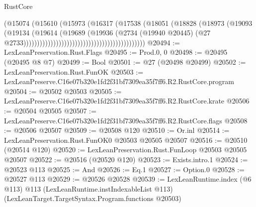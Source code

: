 \begin{lexlean}{RustCore}
\begin{coremodule}
                                                                (@15074
                                                                  (@15610
                                                                    (@15973
                                                                      (@16317
                                                                        (@17538
                                                                          (@18051
                                                                            (@18828
                                                                              (@18973
                                                                                (@19093
                                                                                  (@19134
                                                                                    (@19614
                                                                                      (@19689
                                                                                        (@19936
                                                                                          (@2734
                                                                                            (@19940
                                                                                              @20445)
                                                                                            (@27
                                                                                              @2733)))))))))))))))))))))))))))))))))))))))))))))
@20494 := LexLeanPreservation.Rust.Flags
@20495 := Prod.{0, 0}
@20498 := @20495 (@20495 @8 @7)
@20499 := Bool
@20501 := @27 (@20498 @20499)
@20502 := LexLeanPreservation.Rust.FunOK
@20503 := LexLeanPreserve.C16e07b320e1fd2f31bf7309ea35f7ff6.R2.RustCore.program
@20504 := @20502 @20503
@20505 := LexLeanPreserve.C16e07b320e1fd2f31bf7309ea35f7ff6.R2.RustCore.krate
@20506 := @20504 @20505
@20507 := LexLeanPreserve.C16e07b320e1fd2f31bf7309ea35f7ff6.R2.RustCore.flags
@20508 := @20506 @20507
@20509 := @20508 @120
@20510 := Or.inl
@20514 := LexLeanPreservation.Rust.FunOK0 @20503 @20505 @20507
@20516 := @20510 (@20514 @120)
@20520 := LexLeanPreservation.Rust.FunLoop @20503 @20505 @20507
@20522 := @20516 (@20520 @120)
@20523 := Exists.intro.{1}
@20524 := @20523 @113
@20525 := And
@20526 := Eq.{1}
@20527 := Option.{0}
@20528 := @20527 @113
@20529 := @20526 @20528
@20539 := LexLeanRuntime.index
    (@6 @113)
    @113
    (LexLeanRuntime.instIndexableList @113)
    (LexLeanTarget.TargetSyntax.Program.functions @20503)

\end{coremodule}
\end{lexlean}
